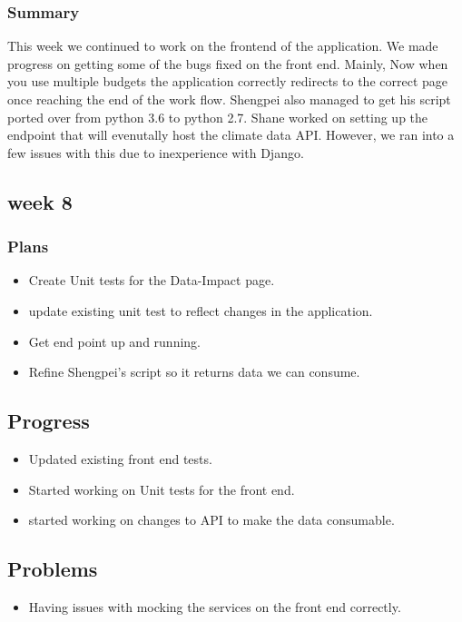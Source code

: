 \documentclass[onecolumn, draftclsnofoot,10pt, compsoc]{article}
\begin{document}
			\subsubsection{Summary} This week we continued to work on the frontend of the application. We made progress on getting some of the bugs fixed on the front end. Mainly, Now when you use multiple budgets the application correctly redirects to the correct page once reaching the end of the work flow. Shengpei also managed to get his script ported over from python 3.6 to python 2.7. Shane worked on setting up the endpoint that will evenutally host the climate data API. However, we ran into a few issues with this due to inexperience with Django.\\
			
		\subsection{week 8}
			\subsubsection{Plans}
				\begin{itemize}
					\item Create Unit tests for the Data-Impact page.
					\item update existing unit test to reflect changes in the application.
					\item Get end point up and running.
					\item Refine Shengpei's script so it returns data we can consume.
				\end{itemize}
			\subsection{Progress}
				\begin{itemize}
					\item Updated existing front end tests.
					\item Started working on Unit tests for the front end.
					\item started working on changes to API to make the data consumable.
				\end{itemize}
			\subsection{Problems}
				\begin{itemize}
					\item Having issues with mocking the services on the front end correctly.
				\end{itemize}
\end{document}
